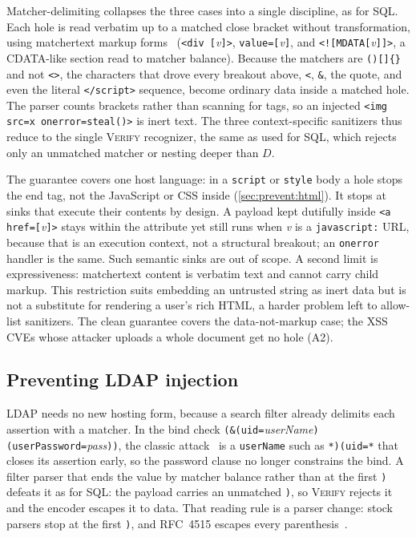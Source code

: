 Matcher-delimiting collapses the three cases into a single discipline,
as for SQL.
Each hole is read verbatim up to a matched close bracket
without transformation,
using matchertext markup forms~\cite{matchertext}
(\eg \verb|<div [|\emph{v}\verb|]>|, \verb|value=[|\emph{v}\verb|]|, and
\verb|<![MDATA[|\emph{v}\verb|]]>|, a CDATA-like section read to matcher balance).
Because the matchers are \verb|()[]{}| and not \verb|<>|, the characters that
drove every breakout above, \verb|<|, \verb|&|, the quote, and even the literal
\verb|</script>| sequence, become ordinary data inside a matched hole.
The parser counts brackets rather than scanning for tags, so an injected
\verb|<img src=x onerror=steal()>| is inert text.
The three context-specific sanitizers thus reduce to the single \textsc{Verify}
recognizer, the same as used for SQL, which rejects only an unmatched
matcher or nesting deeper than $D$.

The guarantee covers one host language: in a \verb|script| or \verb|style|
body a hole stops the end tag, not the JavaScript or CSS inside
(\cref{sec:prevent:html}). It stops at sinks that execute their contents by design.
A payload kept dutifully inside \verb|<a href=[|\emph{v}\verb|]>| stays within the
attribute yet still runs when \emph{v} is a \verb|javascript:| URL, because that
is an execution context, not a structural breakout; an \verb|onerror| handler is
the same.
Such semantic sinks are out of scope.
A second limit is expressiveness: matchertext content is verbatim text and cannot
carry child markup.
This restriction suits embedding an untrusted string as inert data but is not
a substitute for rendering a user's rich HTML, a harder problem left to
allow-list sanitizers.
The clean guarantee covers the data-not-markup case; the \dataDocumentCVEs XSS
CVEs whose attacker uploads a whole document get no hole (A2).

\subsection{Preventing LDAP injection}
\label{sec:resist:ldap}

LDAP needs no new hosting form, because a search filter already delimits each
assertion with a matcher.
In the bind check
\verb|(&(uid=|\textit{userName}\verb|)(userPassword=|\textit{pass}\verb|))|, the
classic attack~\cite{alonso08ldap} is a \verb|userName| such as \verb|*)(uid=*|
that closes its assertion early, so the password clause no longer constrains the
bind.
A filter parser that ends the value by matcher balance rather than at the first
\verb|)| defeats it as for SQL: the payload carries an unmatched \verb|)|, so
\textsc{Verify} rejects it and the encoder escapes it to data. That reading rule is a parser change:
stock parsers stop at the first \verb|)|, and RFC~4515 escapes every
parenthesis~\cite{rfc4515}.

